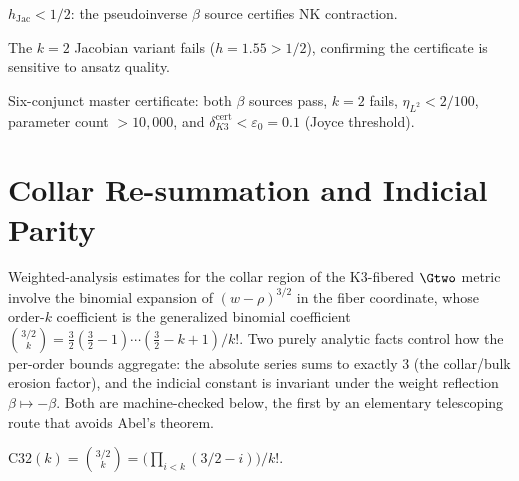 \begin{theorem}\label{thm:k3_jac}
    \leanok
    $h_{\mathrm{Jac}} < 1/2$: the pseudoinverse $\beta$ source certifies NK contraction.
\end{theorem}

\begin{theorem}\label{thm:k3_selective}
    \leanok
    The $k=2$ Jacobian variant fails ($h = 1.55 > 1/2$), confirming the certificate
    is sensitive to ansatz quality.
\end{theorem}

\begin{theorem}\label{thm:k3_nk_master}
    \leanok
    Six-conjunct master certificate: both $\beta$ sources pass, $k=2$ fails,
    $\eta_{L^2} < 2/100$, parameter count $> 10{,}000$,
    and $\delta_{K3}^{\mathrm{cert}} < \varepsilon_0 = 0.1$ (Joyce threshold).
\end{theorem}

\section{Collar Re-summation and Indicial Parity}\label{sec:collar_resummation}

Weighted-analysis estimates for the collar region of the K3-fibered $\Gtwo$ metric
involve the binomial expansion of $(w - \rho)^{3/2}$ in the fiber coordinate, whose
order-$k$ coefficient is the generalized binomial coefficient
$\binom{3/2}{k} = \tfrac{3}{2}(\tfrac{3}{2} - 1)\cdots(\tfrac{3}{2} - k + 1)/k!$.
Two purely analytic facts control how the per-order bounds aggregate: the absolute
series sums to exactly $3$ (the collar/bulk erosion factor), and the indicial
constant is invariant under the weight reflection $\beta \mapsto -\beta$. Both are
machine-checked below, the first by an elementary telescoping route that avoids
Abel's theorem.

\begin{definition}\label{def:C32}
    \leanok
    $\mathrm{C32}(k) = \binom{3/2}{k}
    = \bigl(\textstyle\prod_{i<k} (3/2 - i)\bigr) / k!$.
\end{definition}


